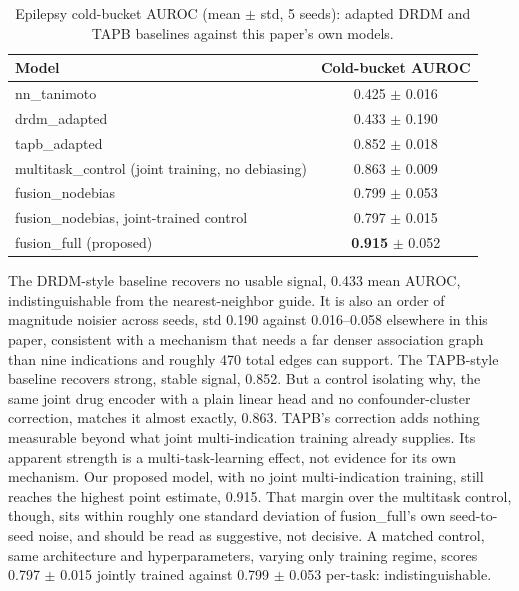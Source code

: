 \documentclass{llncs}
\begin{document}
\begin{table}[t]
\centering
\small
\caption{Epilepsy cold-bucket AUROC (mean $\pm$ std, 5 seeds): adapted DRDM and TAPB baselines against this paper's own models.}
\label{tab:baselines}
\begin{tabular}{lc}
\toprule
Model & Cold-bucket AUROC \\
\midrule
nn\_tanimoto & 0.425 $\pm$ 0.016 \\
drdm\_adapted & 0.433 $\pm$ 0.190 \\
tapb\_adapted & 0.852 $\pm$ 0.018 \\
multitask\_control (joint training, no debiasing) & 0.863 $\pm$ 0.009 \\
fusion\_nodebias & 0.799 $\pm$ 0.053 \\
fusion\_nodebias, joint-trained control & 0.797 $\pm$ 0.015 \\
fusion\_full (proposed) & \textbf{0.915} $\pm$ 0.052 \\
\bottomrule
\end{tabular}
\end{table}

The DRDM-style baseline recovers no usable signal, 0.433 mean AUROC, indistinguishable from the nearest-neighbor guide. It is also an order of magnitude noisier across seeds, std 0.190 against 0.016--0.058 elsewhere in this paper, consistent with a mechanism that needs a far denser association graph than nine indications and roughly 470 total edges can support. The TAPB-style baseline recovers strong, stable signal, 0.852. But a control isolating why, the same joint drug encoder with a plain linear head and no confounder-cluster correction, matches it almost exactly, 0.863. TAPB's correction adds nothing measurable beyond what joint multi-indication training already supplies. Its apparent strength is a multi-task-learning effect, not evidence for its own mechanism. Our proposed model, with no joint multi-indication training, still reaches the highest point estimate, 0.915. That margin over the multitask control, though, sits within roughly one standard deviation of fusion\_full's own seed-to-seed noise, and should be read as suggestive, not decisive. A matched control, same architecture and hyperparameters, varying only training regime, scores 0.797 $\pm$ 0.015 jointly trained against 0.799 $\pm$ 0.053 per-task: indistinguishable.
\end{document}
